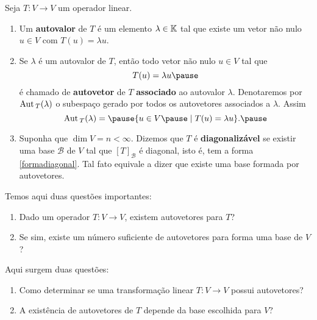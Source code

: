 \documentclass{beamer}
\begin{document}
    \begin{frame}
    \begin{definicao}
        Seja $T : V \to V$ um operador linear.\pause
        \begin{enumerate}[label={\roman*})]
            \item Um \textbf{autovalor} \pause de $T$ é um elemento $\lambda \in \mathbb{K}$ \pause tal que existe um vetor não nulo \pause $u \in V$ \pause com $T(u) = \lambda u$.\pause {}
            \item Se $\lambda$ é um autovalor de $T$, \pause então todo vetor não nulo \pause $u \in V$ tal que\pause
            \[
                T(u) = \lambda u\pause
            \]
            é chamado de \textbf{autovetor} \pause de $T$ \textbf{associado} ao autovalor $\lambda$. \pause Denotaremos por ${\rm Aut\,}_T(\lambda)$ \pause o subespaço gerado por todos os autovetores associados a $\lambda$. \pause Assim\pause
            \[
                \aut_T(\lambda) = \pause \{u \in V \pause \mid T(u) = \lambda u\}.\pause
            \]
            \item Suponha que $\dim V = n < \infty$. \pause Dizemos que $T$ é \textbf{diagonalizável} \pause se existir uma base $\mathcal{B}$ de $V$ \pause tal que $[T]_\mathcal{B}$ é diagonal, \pause isto é, tem a forma \eqref{formadiagonal}. \pause Tal fato equivale a dizer que existe uma base formada por autovetores.
        \end{enumerate}
    \end{definicao}
    \end{frame}

    \begin{frame}
        Temos aqui duas questões importantes:\pause
        \begin{enumerate}[label={\arabic*})]
            \item Dado um operador $T \colon V \to V$, \pause existem autovetores para $T$?\pause

            \item Se sim, \pause existe um número suficiente de autovetores \pause para forma uma base de $V$?
        \end{enumerate}
    \end{frame}

    \begin{frame}
        Aqui surgem duas questões:\pause
        \begin{enumerate}[label={\arabic*})]
            \item Como determinar se uma transformação linear $T \colon V \to V$ \pause possui autovetores?\pause

            \item A existência de autovetores de $T$ \pause depende da base escolhida para $V$?\pause
        \end{enumerate}
    \end{frame}
\end{document}
